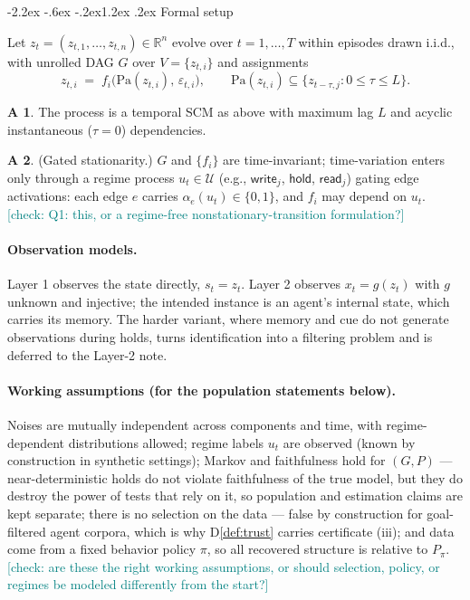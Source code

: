 \documentclass[10pt]{article}
\makeatletter
\newcommand{\Pa}{\mathrm{Pa}}
\newcommand{\checkY}[1]{\textcolor{teal}{\footnotesize [check: #1]}}
\renewcommand\section{\@startsection{section}{1}{\z@}%
  {-2.2ex \@plus -.6ex \@minus -.2ex}{1.2ex \@plus .2ex}%
  {\normalfont\large\bfseries}}
\theoremstyle{plain}
\theoremstyle{definition}
\newtheorem{assumption}{A}
\makeatother
\begin{document}
\section{Formal setup}\label{sec:setup}

Let $z_t = (z_{t,1},\dots,z_{t,n}) \in \mathbb{R}^n$ evolve over $t = 1,\dots,T$ within episodes drawn i.i.d., with unrolled DAG $G$ over $V = \{z_{t,i}\}$ and assignments
\[
z_{t,i} \;=\; f_i\big(\Pa(z_{t,i}),\, \varepsilon_{t,i}\big),
\qquad \Pa(z_{t,i}) \subseteq \{z_{t-\tau, j} : 0 \le \tau \le L\}.
\]

\begin{assumption}\label{a:scm}
The process is a temporal SCM as above with maximum lag $L$ and acyclic instantaneous ($\tau=0$) dependencies.
\end{assumption}

\begin{assumption}\label{a:gated}
(Gated stationarity.) $G$ and $\{f_i\}$ are time-invariant; time-variation enters only through a regime process $u_t \in \mathcal{U}$ (e.g., $\mathsf{write}_j$, $\mathsf{hold}$, $\mathsf{read}_j$) gating edge activations: each edge $e$ carries $\alpha_e(u_t) \in \{0,1\}$, and $f_i$ may depend on $u_t$. \checkY{Q1: this, or a regime-free nonstationary-transition formulation?}
\end{assumption}

\paragraph{Observation models.} Layer 1 observes the state directly, $s_t = z_t$. Layer 2 observes $x_t = g(z_t)$ with $g$ unknown and injective; the intended instance is an agent's internal state, which carries its memory. The harder variant, where memory and cue do not generate observations during holds, turns identification into a filtering problem and is deferred to the Layer-2 note.

\paragraph{Working assumptions (for the population statements below).} Noises are mutually independent across components and time, with regime-dependent distributions allowed; regime labels $u_t$ are observed (known by construction in synthetic settings); Markov and faithfulness hold for $(G,P)$ --- near-deterministic holds do not violate faithfulness of the true model, but they do destroy the power of tests that rely on it, so population and estimation claims are kept separate; there is no selection on the data --- false by construction for goal-filtered agent corpora, which is why D\ref{def:trust} carries certificate (iii); and data come from a fixed behavior policy $\pi$, so all recovered structure is relative to $P_\pi$. \checkY{are these the right working assumptions, or should selection, policy, or regimes be modeled differently from the start?}
\end{document}
